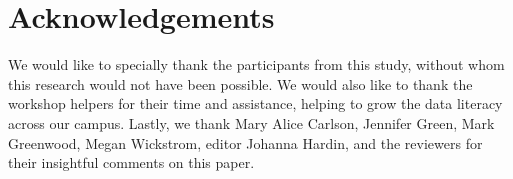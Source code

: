 \documentclass[12pt]{article}
\begin{document}

\section{Acknowledgements}

We would like to specially thank the participants from this study, without whom
this research would not have been possible. We would also like to thank the 
workshop helpers for their time and assistance, helping to grow the data 
literacy across our campus. Lastly, we thank Mary Alice Carlson, Jennifer Green,
Mark Greenwood, Megan Wickstrom, editor Johanna Hardin, and the reviewers for
their insightful comments on this paper. 



\end{document}
